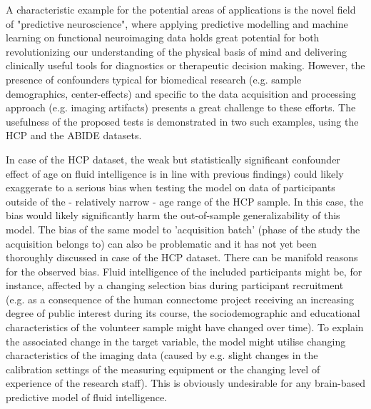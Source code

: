 \documentclass{article}
\begin{document}
A characteristic example for the potential areas of applications is the novel field of "predictive neuroscience", where applying predictive modelling and machine learning on functional neuroimaging data holds great potential for both revolutionizing our understanding of the physical basis of mind and delivering clinically useful tools for diagnostics or therapeutic decision making\citep{woo2017building, wager2013fmri, spisak2020pain}. However, the presence of confounders typical for biomedical research (e.g. sample demographics, center-effects) and specific to the data acquisition and processing approach (e.g. imaging artifacts) presents a great challenge to these efforts.
The usefulness of the proposed tests is demonstrated in two such examples, using the HCP\citep{van2013wu}  and the ABIDE\citep{di2014autism} datasets.

In case of the HCP dataset, the weak but statistically significant confounder effect of age on fluid intelligence is in line with previous findings\citep{dubois2018distributed, lohmann2021predicting}) could likely exaggerate to a serious bias when testing the model on data of participants outside of the - relatively narrow - age range of the HCP sample. In this case, the bias would likely significantly harm the out-of-sample generalizability of this model. The bias of the same model to 'acquisition batch' (phase of the study the acquisition belongs to) can also be problematic and it has not yet been thoroughly discussed in case of the HCP dataset. There can be manifold reasons for the observed bias. Fluid intelligence of the included participants might be, for instance, affected by a changing selection bias during participant recruitment (e.g. as a consequence of the human connectome project receiving an increasing degree of public interest during its course, the sociodemographic and educational characteristics of the volunteer sample might have changed over time). To explain the associated change in the target variable, the model might utilise changing characteristics of the imaging data (caused by e.g. slight changes in the calibration settings of the measuring equipment or the changing level of experience of the research staff). This is obviously undesirable for any brain-based predictive model of fluid intelligence.
\end{document}
